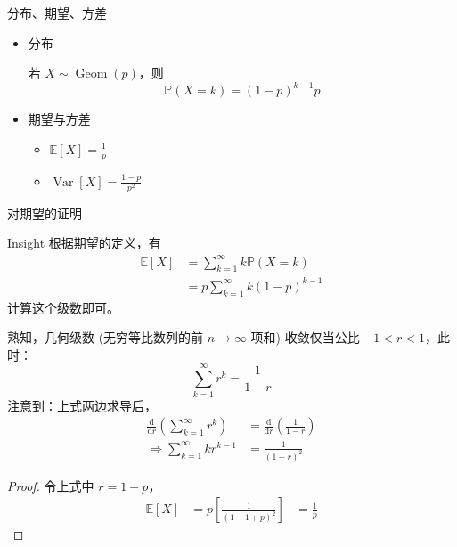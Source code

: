 \documentclass{beamer}
\newcommand{\E}{\mathbb{E}}
\newcommand{\Prob}{\mathbb{P}}
\newcommand{\Geom}{\operatorname{Geom}}
\newcommand{\Var}{\operatorname{Var}}
\begin{document}
\begin{frame}{分布、期望、方差}
    \begin{itemize}
        \item 分布
        \begin{theorem}
            若 $X\sim \Geom(p)$，则
            $$
                \Prob(X=k) = (1-p)^{k - 1}p
            $$
        \end{theorem}
        \pause
        \item 期望与方差
        \begin{corollary}
            \begin{itemize}
                \item $\E[X] = \frac1p$
                \item $\Var[X] = \frac{1 - p}{p^2}$
            \end{itemize}
        \end{corollary}
    \end{itemize}
\end{frame}

\begin{frame}[allowframebreaks]{对期望的证明}
    \begin{block}{Insight}
        根据期望的定义，有
        $$
            \begin{aligned}
                \E[X] &= \sum_{k = 1}^\infty k\Prob(X=k)\\
                &= p\sum_{k = 1}^\infty k(1-p)^{k - 1}
            \end{aligned}
        $$
        计算这个级数即可。
    \end{block}

    \begin{lemma}
        熟知，几何级数 (无穷等比数列的前 $n\to \infty$ 项和) 收敛仅当公比 $-1 < r < 1$，此时：
        $$
        \sum_{k = 1}^{\infty} r^k = \frac{1}{1 - r}
        $$
        注意到：上式两边求导后，
        $$
        \begin{aligned}
            \frac{\mathrm d}{\mathrm dr}\left(\sum_{k = 1}^{\infty} r^k\right) &=  \frac{\mathrm d}{\mathrm dr}\left(\frac{1}{1 - r}\right)\\
            \Rightarrow \sum_{k = 1}^{\infty} kr^{k - 1} &= \boxed{\frac{1}{(1 - r)^2}}
        \end{aligned}
        $$
    \end{lemma}

    \begin{proof}
        令上式中 $r = 1 - p$，
        $$
        \begin{aligned}
            \E[X] &= p\left[\frac{1}{(1 - 1 + p)^2}\right]
            &= \frac 1p
        \end{aligned}
        $$
    \end{proof}

\end{frame}
\end{document}
